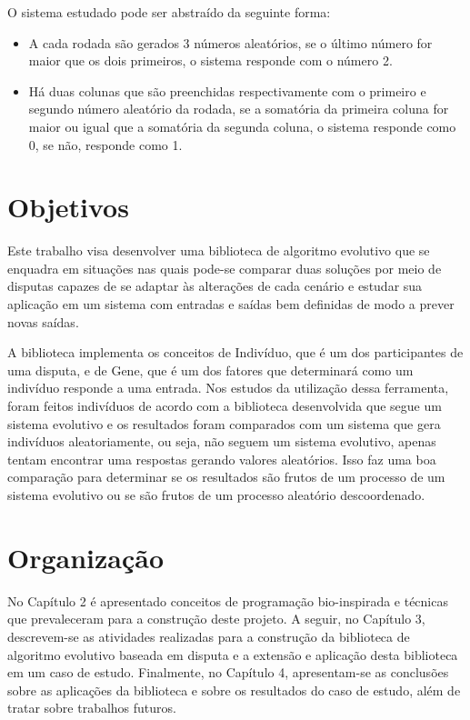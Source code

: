 O sistema estudado pode ser abstraído da seguinte forma:
\begin{itemize}
    \item A cada rodada são gerados 3 números aleatórios, se o último número for maior que os dois primeiros, o sistema responde com o número 2.
    \item Há duas colunas que são preenchidas respectivamente com o primeiro e segundo número aleatório da rodada, se a somatória da primeira coluna for maior ou igual que a somatória da segunda coluna, o sistema responde como 0, se não, responde como 1.
\end{itemize}

\section{Objetivos}

Este trabalho visa desenvolver uma biblioteca de algoritmo evolutivo que se enquadra em situações nas quais pode-se comparar duas soluções por meio de disputas capazes de se adaptar às alterações de cada cenário e estudar sua aplicação em um sistema com entradas e saídas bem definidas de modo a prever novas saídas.

A biblioteca implementa os conceitos de Indivíduo, que é um dos participantes de uma disputa, e de Gene, que é um dos fatores que determinará como um indivíduo responde a uma entrada. Nos estudos da utilização dessa ferramenta, foram feitos indivíduos de acordo com a biblioteca desenvolvida que segue um sistema evolutivo e os resultados foram comparados com um sistema que gera indivíduos aleatoriamente, ou seja, não seguem um sistema evolutivo, apenas tentam encontrar uma respostas gerando valores aleatórios. Isso faz uma boa comparação para determinar se os resultados são frutos de um processo de um sistema evolutivo ou se são frutos de um processo aleatório descoordenado.

\section{Organização}

No Capítulo 2 é apresentado conceitos de programação bio-inspirada e técnicas que prevaleceram para a construção deste projeto. A seguir, no Capítulo 3, descrevem-se as atividades realizadas para a construção da biblioteca de algoritmo evolutivo baseada em disputa e a extensão e aplicação desta biblioteca em um caso de estudo. Finalmente, no Capítulo 4, apresentam-se as conclusões sobre as aplicações da biblioteca e sobre os resultados do caso de estudo, além de tratar sobre trabalhos futuros.

